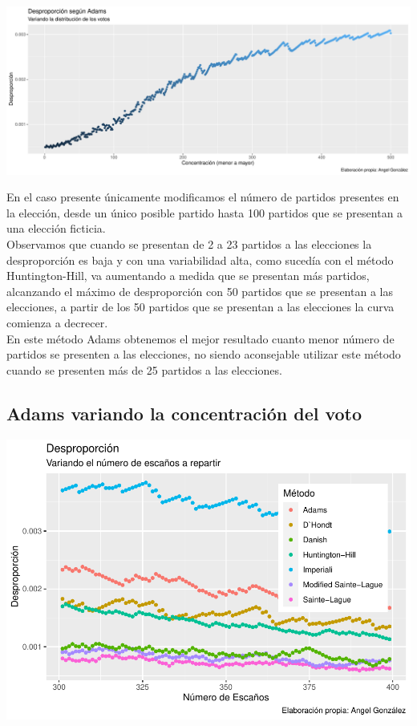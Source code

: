 \documentclass[12pt,a4paper,]{book}
\numberwithin{dummy}{section}
\theoremstyle{ocrenumbox}
\theoremstyle{blacknumex}
\theoremstyle{blacknumbox}
\theoremstyle{ocrenum}
\theoremstyle{ocrenum}
\begin{document}
\begin{center}\includegraphics[width=0.95\linewidth]{figurasR/unnamed-chunk-39-1} \end{center}

En el caso presente únicamente modificamos el número de partidos
presentes en la elección, desde un único posible partido hasta 100
partidos que se presentan a una elección ficticia.\\
Observamos que cuando se presentan de 2 a 23 partidos a las elecciones
la desproporción es baja y con una variabilidad alta, como sucedía con
el método Huntington-Hill, va aumentando a medida que se presentan más
partidos, alcanzando el máximo de desproporción con 50 partidos que se
presentan a las elecciones, a partir de los 50 partidos que se presentan
a las elecciones la curva comienza a decrecer.\\
En este método Adams obtenemos el mejor resultado cuanto menor número de
partidos se presenten a las elecciones, no siendo aconsejable utilizar
este método cuando se presenten más de 25 partidos a las elecciones.

\hypertarget{adams-variando-la-concentraciuxf3n-del-voto}{%
\subsection{Adams variando la concentración del
voto}\label{adams-variando-la-concentraciuxf3n-del-voto}}

\begin{center}\includegraphics[width=0.95\linewidth]{figurasR/unnamed-chunk-40-1} \end{center}
\end{document}

